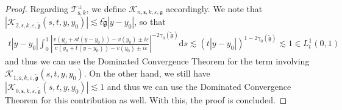 \documentclass[11pt,reqno]{amsproc}
\theoremstyle{definition}
\numberwithin{equation}{section}
\newcommand{\sr}{{\mathsf{r}}}
\newcommand{\s}{{\mathsf{s}}}
\newcommand{\cT}{{\mathcal T}}
\renewcommand{\d}{\mathrm{d}}
\newcommand{\ep}{\varepsilon}
\newcommand{\g}{{\mathfrak{g}}}
\begin{document}
\begin{proof}
Regarding $\cT_{\s,k}^\pm$, we define $\mathcal{K}_{n,\s,k,\ep,\g}$ accordingly. We note that $\left| \mathcal{K}_{2,\sr,k,\ep,\tilde\g}(s,t,y,y_0) \right| \lesssim t\tilde\g|y-y_0|$, so that
\begin{align*}
t|y-y_0|\int_0^1 \left| \frac{v(y_0 + st(y-y_0)) - v(y_0) \pm i\ep}{v(y_0 + t(y-y_0)) - v(y_0) \pm i\ep}\right|^{-2\gamma_0(\tilde\g)}   \d s \lesssim (t|y-y_0|)^{1-2\gamma_0(\tilde\g)} \lesssim 1\in L^1_t(0,1)
\end{align*}
and thus we can use the Dominated Convergence Theorem for the term involving $\mathcal{K}_{1,\s,k,\ep,\tilde\g}(s,t,y,y_0)$. On the other hand, we still have $\left| \mathcal{K}_{0,\s,k,\ep,\tilde\g}(s,t,y,y_0) \right| \lesssim 1$ and thus we can use the Dominated Convergence Theorem for this contribution as well. With this, the proof is concluded.
\end{proof}
\end{document}
